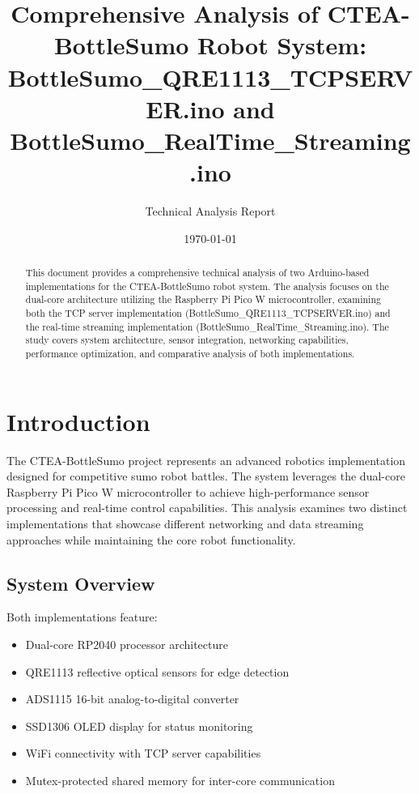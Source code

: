 \documentclass[12pt,a4paper]{article}
\title{\textbf{Comprehensive Analysis of CTEA-BottleSumo Robot System:\\
BottleSumo\_QRE1113\_TCPSERVER.ino and BottleSumo\_RealTime\_Streaming.ino}}
\author{Technical Analysis Report}
\date{\today}
\begin{document}
\maketitle

\begin{abstract}
This document provides a comprehensive technical analysis of two Arduino-based implementations for the CTEA-BottleSumo robot system. The analysis focuses on the dual-core architecture utilizing the Raspberry Pi Pico W microcontroller, examining both the TCP server implementation (BottleSumo\_QRE1113\_TCPSERVER.ino) and the real-time streaming implementation (BottleSumo\_RealTime\_Streaming.ino). The study covers system architecture, sensor integration, networking capabilities, performance optimization, and comparative analysis of both implementations.
\end{abstract}

\tableofcontents
\newpage

\section{Introduction}

The CTEA-BottleSumo project represents an advanced robotics implementation designed for competitive sumo robot battles. The system leverages the dual-core Raspberry Pi Pico W microcontroller to achieve high-performance sensor processing and real-time control capabilities. This analysis examines two distinct implementations that showcase different networking and data streaming approaches while maintaining the core robot functionality.

\subsection{System Overview}
Both implementations feature:
\begin{itemize}
    \item Dual-core RP2040 processor architecture
    \item QRE1113 reflective optical sensors for edge detection
    \item ADS1115 16-bit analog-to-digital converter
    \item SSD1306 OLED display for status monitoring
    \item WiFi connectivity with TCP server capabilities
    \item Mutex-protected shared memory for inter-core communication
\end{itemize}
\end{document}
